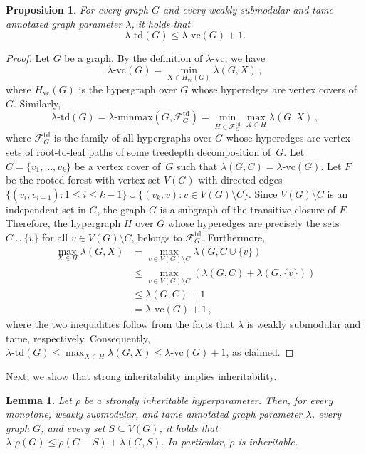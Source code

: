 \documentclass[11pt]{article}
\newcommand{\td}{\mathrm{td}}
\newcommand{\minmax}{\mathrm{minmax}}
\newcommand{\vc}{\mathrm{vc}}
\theoremstyle{plain}
\newtheorem{lemma}[theorem]{Lemma}
\newtheorem{proposition}[theorem]{Proposition}
\theoremstyle{definition}
\theoremstyle{remark}
\numberwithin{equation}{section}
\begin{document}
\begin{proposition}\label{prop:lambda-td-vc}
    For every graph $G$ and every weakly submodular and tame annotated graph parameter $\lambda$, it holds that
    \[
    \lambda\text{-}\td(G) \leq  \lambda\text{-}\vc(G)+1.
    \]
\end{proposition}

\begin{proof}
Let $G$ be a graph.
By the definition of $\lambda\text{-}\vc$, we have \[\lambda\text{-}\vc(G) = \min_{X\in H_{\vc}(G)}\lambda(G,X)\,,\] where $H_{\vc}(G)$ is the hypergraph over $G$ whose hyperedges are vertex covers of~$G$.
Similarly, 
\[\lambda\text{-}\td(G) = \lambda\text{-}\minmax(G,\mathcal{F}_G^{\td})= \min_{H\in \mathcal{F}_G^{\td}}\max_{X\in H}\lambda(G,X)\,,\] where $\mathcal{F}_G^{\td}$ is the family of all hypergraphs over $G$ whose hyperedges are vertex sets of root-to-leaf paths of some treedepth decomposition of~$G$.
Let $C = \{v_1,\ldots, v_k\}$ be a vertex cover of~$G$ such that $\lambda(G,C) = \lambda\text{-}\vc(G)$.
Let $F$ be the rooted forest with vertex set $V(G)$ with directed edges $\{(v_i,v_{i+1})\colon 1\le i\le k-1\}\cup \{(v_k,v)\colon v\in V(G)\setminus C\}$. 
Since $V(G)\setminus C$ is an independent set in $G$, the graph $G$ is a subgraph of the transitive closure of $F$.
Therefore, the hypergraph $H$ over $G$ whose hyperedges are precisely the sets $C\cup \{v\}$ for all $v\in V(G)\setminus C$, belongs to $\mathcal{F}_G^{\td}$.
Furthermore, 
\begin{align*}
\max_{X\in H}\lambda(G,X) &= \max_{v\in V(G)\setminus C} \lambda(G,C\cup \{v\}) \\
&\le 
 \max_{v\in V(G)\setminus C} \left(\lambda(G,C)+\lambda(G,\{v\})\right)\\ 
 &\le \lambda(G,C)+1\\
 &= \lambda\text{-}\vc(G)+1\,,
\end{align*}
where the two inequalities follow from the facts that $\lambda$ is weakly submodular and tame, respectively.
Consequently, $\lambda\text{-}\td(G)\le \max_{X\in H}\lambda(G,X)\le \lambda\text{-}\vc(G)+1$, as claimed.
\end{proof}

Next, we show that strong inheritability implies inheritability. 

\begin{lemma}\label{inheritable-lambda-rho at most}
Let $\rho$ be a strongly inheritable hyperparameter.
Then, for every monotone, weakly submodular, and tame annotated graph parameter $\lambda$, every graph $G$, and every set $S\subseteq V(G)$, it holds that $\lambda\text{-}\rho(G)\le \rho(G-S) + \lambda(G,S)$.
In particular, $\rho$ is inheritable.
\end{lemma}
\end{document}
